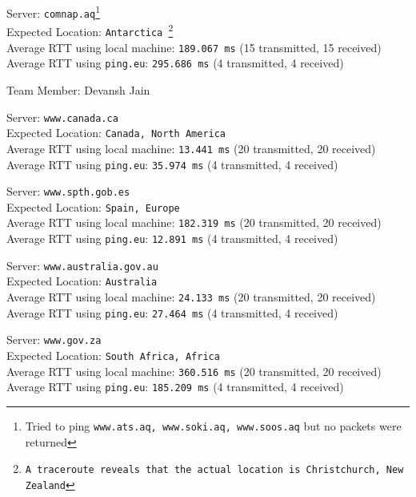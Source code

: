 \documentclass[11pt, fleqn]{article}
\begin{document}
\hrulefill
\smallskip

Server: \texttt{comnap.aq}\footnote{Tried to ping \texttt{www.ats.aq, www.soki.aq, www.soos.aq} but no packets were returned}\\
Expected Location: \texttt{Antarctica \footnote{A \texttt{traceroute} reveals that the actual location is Christchurch, New Zealand}}\\
Average RTT using local machine: \texttt{189.067 ms} (15 transmitted, 15 received)\\
Average RTT using \texttt{ping.eu}: \texttt{295.686 ms} (4 transmitted, 4 received)



\newpage


Team Member: Devansh Jain

\hrulefill
\smallskip

Server: \texttt{www.canada.ca} \\
Expected Location: \texttt{Canada, North America}\\
Average RTT using local machine: \texttt{13.441 ms} (20 transmitted, 20 received)\\
Average RTT using \texttt{ping.eu}: \texttt{35.974 ms} (4 transmitted, 4 received)

\hrulefill
\smallskip

Server: \texttt{www.spth.gob.es}\\
Expected Location: \texttt{Spain, Europe}\\
Average RTT using local machine: \texttt{182.319 ms} (20 transmitted, 20 received)\\
Average RTT using \texttt{ping.eu}: \texttt{12.891 ms} (4 transmitted, 4 received)

\hrulefill
\smallskip

Server: \texttt{www.australia.gov.au}\\
Expected Location: \texttt{Australia}\\
Average RTT using local machine: \texttt{24.133 ms} (20 transmitted, 20 received)\\
Average RTT using \texttt{ping.eu}: \texttt{27.464 ms} (4 transmitted, 4 received)

\hrulefill
\smallskip

Server: \texttt{www.gov.za}\\
Expected Location: \texttt{South Africa, Africa}\\
Average RTT using local machine: \texttt{360.516 ms} (20 transmitted, 20 received)\\
Average RTT using \texttt{ping.eu}: \texttt{185.209 ms} (4 transmitted, 4 received)
\end{document}
